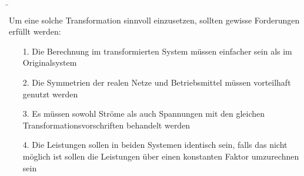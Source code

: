 \begin{frame}
    \b{
        Um eine solche Transformation sinnvoll einzusetzen, sollten gewisse Forderungen erfüllt werden:
        
    \begin{itemize}
        \item [1.]Die Berechnung im transformierten System müssen einfacher sein als im Originalsystem
        \item [2.]Die Symmetrien der realen Netze und Betriebsmittel müssen vorteilhaft genutzt werden
        \item [3.]Es müssen sowohl Ströme als auch Spannungen mit den gleichen Transformationsvorschriften behandelt werden
        \item [4.]Die Leistungen sollen in beiden Systemen identisch sein, falls das nicht möglich ist sollen die Leistungen über einen konstanten Faktor umzurechnen sein
    \end{itemize}
    }
\end{frame}





